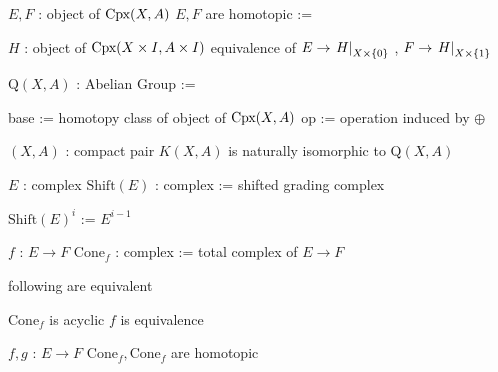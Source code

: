 \documentclass[dvipdfmx]{jsarticle}
\begin{document}
\begin{Definition}
\itemenum \(E,F\) : object of \(\text{Cpx}(X, A)\)
\itemthen \THENLINE
\itemenum \(E,F\) are homotopic :=
  \begin{itemize}
    \itemenum \(H\) : object of \(\text{Cpx}(X \times I, A \times I)\)
    \itemenum equivalence of \(E \to \left. {H} \right| _{X \times \{0\}}\) , \(F \to \left. {H} \right| _{X \times \{1\}}\)
  \end{itemize}
\end{Definition}

\newcommand{\AltDefKth}[1]{\text{Q}(#1)}
\newcommand{\AltDefRelKth}[2]{\text{Q}(#1, #2)}
\begin{Definition}
\itemthen \THENLINE
\itemenum \(\AltDefRelKth{X}{A}\) : Abelian Group :=
  \begin{itemize}
    \itemenum base := homotopy class of object of \(\text{Cpx}(X, A)\) 
    \itemenum op := operation induced by \(\oplus\)
  \end{itemize}
\end{Definition}

\begin{Theorem}[A.I]
\itemenum \((X,A)\) : compact pair
\itemthen \THENLINE
\itemwith \(K(X,A)\) is naturally isomorphic to \(\AltDefRelKth{X}{A}\)
\end{Theorem}

\newcommand{\ShiftCpx}[1]{\text{Shift}(#1)}
\begin{Definition}
\itemenum \(E\) : complex
\itemthen \THENLINE
\itemenum \(\ShiftCpx{E}\) : complex := shifted grading complex 
  \begin{itemize}
    \itemenum \(\ShiftCpx{E}^i\) := \(E^{i-1}\)
  \end{itemize}
\end{Definition}

\newcommand{\MapconeCpx}[1]{\text{Cone}_f}
\begin{Definition}
\itemenum \(f\) : \(E \to F\)
\itemthen \THENLINE
\itemenum \(\MapconeCpx{f}\) : complex := total complex of \(E \to F\)
\end{Definition}

\begin{Theorem}
\itemthen \THENLINE
\itemwith following are equivalent
\begin{itemize}
  \itemwith \(\MapconeCpx{f}\) is acyclic
  \itemwith \(f\) is equivalence
\end{itemize}
\end{Theorem}

\begin{Theorem}
\itemenum \(f,g\) : \(E \to F\) 
\itemthen \THENLINE
\itemwith \(\MapconeCpx{f}, \MapconeCpx{g}\) are homotopic
\end{Theorem}
\end{document}
